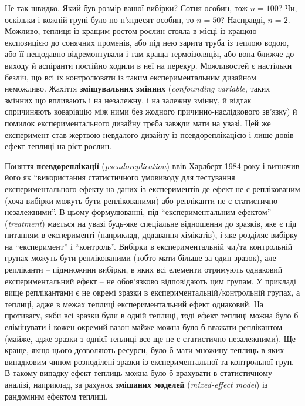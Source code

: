 \documentclass[
  11pt,
]{book}
\begin{document}
Не так швидко. Який був розмір вашої вибірки? Сотня особин, тож \(n = 100\)? Чи, оскільки і кожній групі було по п'ятдесят особин, то \(n = 50\)? Насправді, \(n = 2\). Можливо, теплиця із кращим ростом рослин стояла в місці із кращою експозицією до сонячних променів, або під нею зарита труба із теплою водою, або її нещодавно відремонтували і там краща термоізоляція, або вона ближче до виходу й аспіранти постійно ходили в неї на перекур. Можливостей є настільки безліч, що всі їх контролювати із таким експериментальним дизайном неможливо. Жахіття \textbf{змішувальних змінних} (\emph{confounding variable}, таких змінних що впливають і на незалежну, і на залежну змінну, й відтак спричиняють коваріацію між ними без жодного причинно-наслідкового зв'язку) й помилок експериментального дизайну треба завжди мати на увазі. Цей же експеримент став жертвою невдалого дизайну із псевдореплікацією і лише довів ефект теплиці на ріст рослин.

Поняття \textbf{псевдореплікації} (\emph{pseudoreplication}) ввів \href{https://doi.org/10.2307/1942661}{Харлберт 1984 року} і визначив його як ``використання статистичного умовиводу для тестування експериментального ефекту на даних із експериментів де ефект не є реплікованим (хоча вибірки можуть бути реплікованими) або репліканти не є статистично незалежними''. В цьому формулюванні, під ``експериментальним ефектом'' (\emph{treatment}) мається на увазі будь-яке спеціальне відношення до зразків, яке є під питанням в експерименті (наприклад, додавання хімікатів), і яке розділяє вибірку на ``експеримент'' і ``контроль''. Вибірки в експериментальній чи/та контрольній групах можуть бути реплікованими (тобто мати більше за один зразок), але репліканти -- підмножини вибірки, в яких всі елементи отримують однаковий експериментальний ефект -- не обов'язково відповідають цим групам. У прикладі вище реплікантами є не окремі зразки в експериментальній/контрольній групах, а теплиці, адже в межах теплиці експериментальний ефект однаковий. На противагу, якби всі зразки були в одній теплиці, тоді ефект теплиці можна було б елімінувати і кожен окремий вазон майже можна було б вважати реплікантом (майже, адже зразки з однієї теплиці все ще не є статистично незалежними). Ще краще, якщо цього дозволяють ресурси, було б мати множину теплиць в яких випадковим чином розподілені зразки із експериментальної та контрольної груп. В такому випадку ефект теплиць можна було б врахувати в статистичному аналізі, наприклад, за рахунок \textbf{змішаних моделей} (\emph{mixed-effect model}) із рандомним ефектом теплиці.
\end{document}
